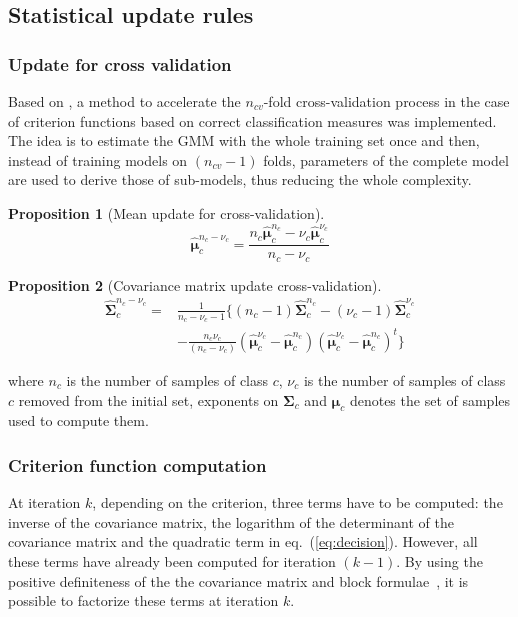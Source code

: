 \documentclass[journal,10pt]{IEEEtran}
\newtheorem{prop}{Proposition}
\begin{document}
\subsection{Statistical update rules}
        \subsubsection{Update for cross validation}
        \label{sec:update-cv}
        Based on \cite{fauvel2015fast}, a method to accelerate the $n_{cv}$-fold cross-validation process in the case of criterion functions based on correct classification measures was implemented. The idea is to estimate the GMM with the whole training set once and then, instead of training models on $(n_{cv}-1)$ folds, parameters of the complete model are used to derive those of sub-models, thus reducing the whole complexity.

        \begin{prop}[Mean update for cross-validation]
            \label{eq:update-cv1}
            \begin{equation*}
                \boldsymbol{\hat{\mu}}_c^{n_c-\nu_c} = \frac{n_c \boldsymbol{\hat{\mu}}_c^{n_c} - \nu_c \boldsymbol{\hat{\mu}}_c^{\nu_c}}{n_c - \nu_c} \nonumber
            \end{equation*}
        \end{prop}
        \begin{prop}[Covariance matrix update cross-validation]
            \label{eq:update-cv2}
            \begin{align*}
              \boldsymbol{\hat{\Sigma}}_c^{n_c-\nu_c} = &\frac{1}{n_c-\nu_c-1} \biggl\{ (n_c-1) \boldsymbol{\hat{\Sigma}}_c^{n_c} - (\nu_c-1)\boldsymbol{\hat{\Sigma}}_c^{\nu_c} \nonumber \\
                                                        &- \frac{n_c \nu_c}{(n_c-\nu_c)} (\boldsymbol{\hat{\mu}}_c^{\nu_c}-\boldsymbol{\hat{\mu}}_c^{n_c})(\boldsymbol{\hat{\mu}}_c^{\nu_c}-\boldsymbol{\hat{\mu}}_c^{n_c})^t \biggr\} \nonumber
            \end{align*}
        \end{prop}
        \noindent where $n_c$ is the number of samples of class $c$, $\nu_c$ is the number of samples of class $c$ removed from the initial set, exponents on $\boldsymbol{\Sigma}_c$ and $\boldsymbol{\mu}_c$ denotes the set of samples used to compute them.

        \subsubsection{Criterion function computation}
        \label{sec:update-crit}
        At iteration $k$, depending on the criterion, three terms have
        to  be computed:  the inverse  of the  covariance matrix,  the
        logarithm of the determinant of  the covariance matrix and the
        quadratic term in  eq.~(\ref{eq:decision}). However, all these
        terms  have already  been computed  for iteration  $(k-1)$. By
        using the  positive definiteness of the  the covariance matrix
        and block formulae~\cite[Chapter 9.2]{webb2003statistical}, it
        is possible to factorize these terms at iteration $k$.
\end{document}
